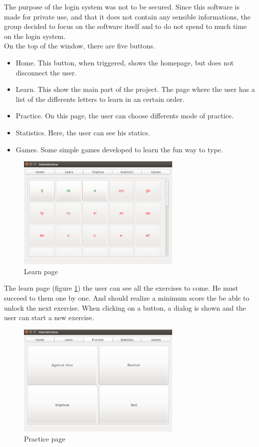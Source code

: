 The purpose of the login system was not to be secured. Since this software is made for private use, and that it does not contain any sensible informations, the group decided to focus on the software itself and to do not spend to much time on the login system. \\
On the top of the window, there are five buttons.
\begin{itemize}
	\item Home. This button, when triggered, shows the homepage, but does not disconnect the user.
	\item Learn. This show the main part of the project. The page where the user has a list of the differents letters to learn in an certain order.
	\item Practice. On this page, the user can choose differents mode of practice.
	\item Statistics. Here, the user can see his statics.
	\item Games. Some simple games developed to learn the fun way to type.
\end{itemize}


\begin{figure}[H]
	\centering
	\includegraphics[width=0.7\textwidth]{images/page-learn.png}
	\caption{Learn page}
	\label{page-learn}
\end{figure}

The learn page (figure \ref{page-learn}) the user can see all the exercises to come. He must succeed to them one by one. And should realize a minimum score the be able to unlock the next exercise. When clicking on a button, a dialog is shown and the user can start a new exercise.

\begin{figure}[H]
	\centering
	\includegraphics[width=0.7\textwidth]{images/page-practice.png}
	 \caption{Practice page}
	 \label{page-practice}
\end{figure}

